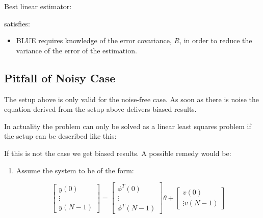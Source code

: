 \documentclass[10pt,a4paper]{scrartcl}
\begin{document}
\begin{multicols*}{2}
Best linear estimator:


satisfies:




\begin{itemize}
\item BLUE requires knowledge of the error covariance, $R$, in order to reduce the variance of the error of the estimation.
\end{itemize}

\subsection{Pitfall of Noisy Case}


The setup above is only valid for the noise-free case.
As soon as there is noise the equation derived from the setup above delivers biased results.

\vspace{3ex}

In actuality the problem can only be solved as a linear least squares problem if the setup can be described like this:


If this is not the case we get biased results. A possible remedy would be:

\begin{enumerate}
\item Assume the system to be of the form:

\begin{equation*}
\begin{bmatrix}
y(0)\\\vdots\\y(N-1)
\end{bmatrix}=\begin{bmatrix}
\phi^T(0)\\
\vdots\\
\phi^T(N-1)
\end{bmatrix}\theta+\begin{bmatrix}
v(0)\\
\vdots
v(N-1)
\end{bmatrix}
\end{equation*}


\end{enumerate}
\end{multicols*}
\end{document}
